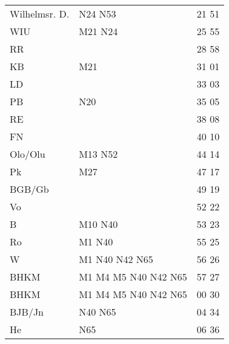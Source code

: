 \begin{tabular}{!{\color{schiefergrau}\vrule width 3pt}*{3}{l!{\color{schiefergrau}\vrule width 3pt}}}
\hline
{}
 \\
\hline
Wilhelmsr. D.& \nbus{} N24 N53                                            & 21 51 \\
WIU          & \mbus{} M21 \nbus{} N24                                    & 25 55 \\
RR           &                                                            & 28 58 \\
KB           & \mbus{} M21                                                & 31 01 \\
LD           &                                                            & 33 03 \\
PB           & \nbus{} N20                                                & 35 05 \\
RE           &                                                            & 38 08 \\
FN           &                                                            & 40 10 \\
Olo/Olu      & \nuneun{} \mtram{} M13 \nbus{} N52                         & 44 14 \\
Pk           & \mbus{} M27                                                & 47 17 \\
BGB/Gb       &                                                            & 49 19 \\
Vo           &                                                            & 52 22 \\
B            & \mtram{} M10 \nbus{} N40                                   & 53 23 \\
Ro           & \mtram{} M1 \nbus{} N40                                    & 55 25 \\
W            & \nuzwei{} \nufuenf{} \mtram{} M1 \nbus{} N40 N42 N65       & 56 26 \\
BHKM         & \nuzwei{} \nufuenf{} \mtram{} M1 M4 M5 \nbus{} N40 N42 N65 & 57 27 \\
\hline
BHKM         & \nuzwei{} \nufuenf{} \mtram{} M1 M4 M5 \nbus{} N40 N42 N65 & 00 30 \\
BJB/Jn       & \nbus{} N40 N65                                            & 04 34 \\
He           & \nbus{} N65                                                & 06 36 \\

\end{tabular}
